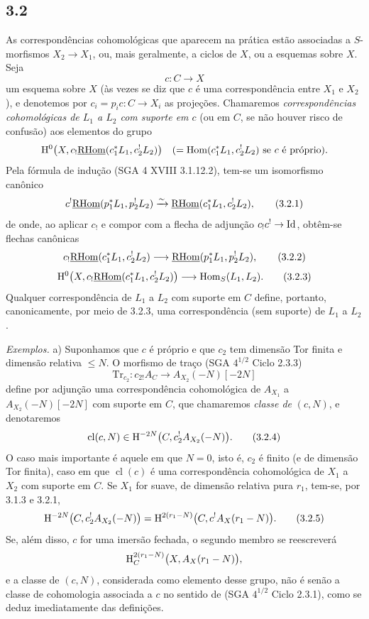 \subsection*{3.2}
As correspondências cohomológicas que aparecem na prática estão associadas a $S$-morfismos $X_2\to X_1$, ou, mais geralmente, a ciclos de $X$, ou a esquemas sobre $X$. Seja
\[
c:C\longrightarrow X
\]
um esquema sobre $X$ (às vezes se diz que $c$ é uma correspondência entre $X_1$ e $X_2$), e denotemos por $c_i=p_ic:C\to X_i$ as projeções. Chamaremos \emph{correspondências cohomológicas de $L_1$ a $L_2$ com suporte em $c$} (ou em $C$, se não houver risco de confusão) aos elementos do grupo
\[
\mathrm{H}^0\bigl(X,c_!\underline{\mathrm{RHom}}(c_1^*L_1,c_2^!L_2)\bigr)
\quad(=\operatorname{Hom}(c_1^*L_1,c_2^!L_2)\text{ se }c\text{ é próprio}).
\]
Pela fórmula de indução (SGA 4 XVIII 3.1.12.2), tem-se um isomorfismo canônico
\begin{equation}
c^!\underline{\mathrm{RHom}}(p_1^*L_1,p_2^!L_2)
\xrightarrow{\sim}
\underline{\mathrm{RHom}}(c_1^*L_1,c_2^!L_2),
\tag{3.2.1}
\end{equation}
de onde, ao aplicar $c_!$ e compor com a flecha de adjunção $c_!c^!\to \mathrm{Id}$, obtêm-se flechas canônicas
\begin{equation}
c_!\underline{\mathrm{RHom}}(c_1^*L_1,c_2^!L_2)
\longrightarrow
\underline{\mathrm{RHom}}(p_1^*L_1,p_2^!L_2),
\tag{3.2.2}
\end{equation}
\begin{equation}
\mathrm{H}^0\bigl(X,c_!\underline{\mathrm{RHom}}(c_1^*L_1,c_2^!L_2)\bigr)
\longrightarrow
\operatorname{Hom}_S(L_1,L_2).
\tag{3.2.3}
\end{equation}
Qualquer correspondência de $L_1$ a $L_2$ com suporte em $C$ define, portanto, canonicamente, por meio de 3.2.3, uma correspondência (sem suporte) de $L_1$ a $L_2$.

\emph{Exemplos.} a) Suponhamos que $c$ é próprio e que $c_2$ tem dimensão Tor finita e dimensão relativa $\leq N$. O morfismo de traço (SGA $4^{1/2}$ Ciclo 2.3.3)
\[
\mathrm{Tr}_{c_2}:c_{2!}A_C\longrightarrow A_{X_2}(-N)[-2N]
\]
define por adjunção uma correspondência cohomológica de $A_{X_1}$ a $A_{X_2}(-N)[-2N]$ com suporte em $C$, que chamaremos \emph{classe de} $(c,N)$, e denotaremos
\begin{equation}
\operatorname{cl}(c,N)\in \mathrm{H}^{-2N}\bigl(C,c_2^!A_{X_2}(-N)\bigr).
\tag{3.2.4}
\end{equation}
O caso mais importante é aquele em que $N=0$, isto é, $c_2$ é finito (e de dimensão Tor finita), caso em que $\operatorname{cl}(c)$ é uma correspondência cohomológica de $X_1$ a $X_2$ com suporte em $C$. Se $X_1$ for suave, de dimensão relativa pura $r_1$, tem-se, por 3.1.3 e 3.2.1,
\begin{equation}
\mathrm{H}^{-2N}\bigl(C,c_2^!A_{X_2}(-N)\bigr)
=
\mathrm{H}^{2(r_1-N)}\bigl(C,c^!A_X(r_1-N)\bigr).
\tag{3.2.5}
\end{equation}
Se, além disso, $c$ for uma imersão fechada, o segundo membro se reescreverá
\[
\mathrm{H}^{2(r_1-N)}_C\bigl(X,A_X(r_1-N)\bigr),
\]
e a classe de $(c,N)$, considerada como elemento desse grupo, não é senão a classe de cohomologia associada a $c$ no sentido de (SGA $4^{1/2}$ Ciclo 2.3.1), como se deduz imediatamente das definições.

